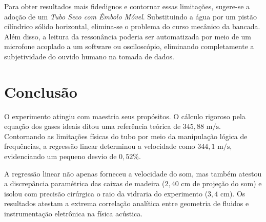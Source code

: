 \documentclass[12pt,a4paper]{article}
\begin{document}
Para obter resultados mais fidedignos e contornar essas limitações, sugere-se a adoção de um \textit{Tubo Seco com Êmbolo Móvel}. Substituindo a água por um pistão cilíndrico sólido horizontal, elimina-se o problema do curso mecânico da bancada. Além disso, a leitura da ressonância poderia ser automatizada por meio de um microfone acoplado a um software ou osciloscópio, eliminando completamente a subjetividade do ouvido humano na tomada de dados.

\section{Conclusão}
O experimento atingiu com maestria seus propósitos. O cálculo rigoroso pela equação dos gases ideais ditou uma referência teórica de $345,88\text{ m/s}$. Contornando as limitações físicas do tubo por meio da manipulação lógica de frequências, a regressão linear determinou a velocidade como $344,1\text{ m/s}$, evidenciando um pequeno desvio de $0,52\%$. 

A regressão linear não apenas forneceu a velocidade do som, mas também atestou a discrepância paramétrica das caixas de madeira ($2,40\text{ cm}$ de projeção do som) e isolou com precisão cirúrgica o raio da vidraria do experimento ($3,4\text{ cm}$). Os resultados atestam a extrema correlação analítica entre geometria de fluidos e instrumentação eletrônica na física acústica.




\end{document}

